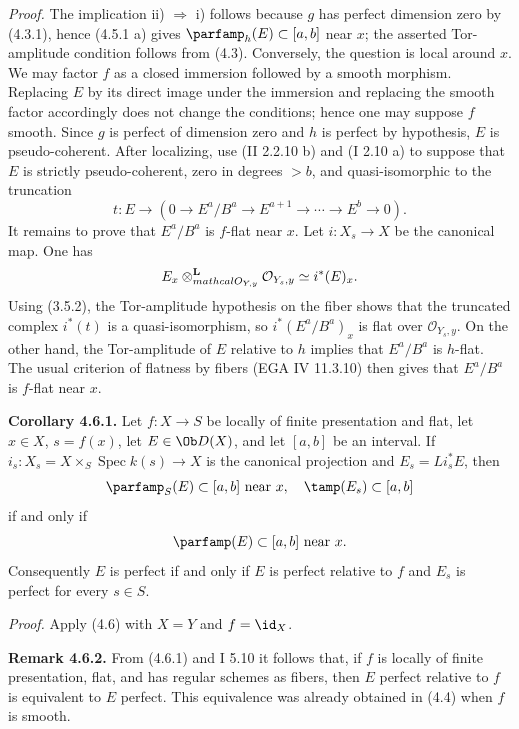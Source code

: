 \documentclass[11pt]{article}
\newcommand{\Spec}{\operatorname{Spec}}
\begin{document}
\emph{Proof.} The implication ii) \(\Rightarrow\) i) follows because \(g\) has perfect dimension zero by (4.3.1), hence (4.5.1 a) gives \(\parfamp_h(E)\subset[a,b]\) near \(x\); the asserted Tor-amplitude condition follows from (4.3). Conversely, the question is local around \(x\). We may factor \(f\) as a closed immersion followed by a smooth morphism. Replacing \(E\) by its direct image under the immersion and replacing the smooth factor accordingly does not change the conditions; hence one may suppose \(f\) smooth. Since \(g\) is perfect of dimension zero and \(h\) is perfect by hypothesis, \(E\) is pseudo-coherent. After localizing, use (II 2.2.10 b) and (I 2.10 a) to suppose that \(E\) is strictly pseudo-coherent, zero in degrees \(>b\), and quasi-isomorphic to the truncation
\[
 t:
 E\longrightarrow
 (0\to E^a/B^a\to E^{a+1}\to\cdots\to E^b\to0).
\]
It remains to prove that \(E^a/B^a\) is \(f\)-flat near \(x\). Let \(i:X_s\to X\) be the canonical map. One has
\[
 E_x\otimes_{\\mathcal O_{Y,y}}^{\mathbf L}\mathcal O_{Y_s,y}
 \simeq i^*(E)_x.
\]
Using (3.5.2), the Tor-amplitude hypothesis on the fiber shows that the truncated complex \(i^*(t)\) is a quasi-isomorphism, so \(i^*(E^a/B^a)_x\) is flat over \(\mathcal O_{Y_s,y}\). On the other hand, the Tor-amplitude of \(E\) relative to \(h\) implies that \(E^a/B^a\) is \(h\)-flat. The usual criterion of flatness by fibers (EGA IV 11.3.10) then gives that \(E^a/B^a\) is \(f\)-flat near \(x\).

\textbf{Corollary 4.6.1.} Let \(f:X\to S\) be locally of finite presentation and flat, let \(x\in X\), \(s=f(x)\), let \(E\in\Ob D(X)\), and let \([a,b]\) be an interval. If \(i_s:X_s=X\times_S\Spec k(s)\to X\) is the canonical projection and \(E_s=Li_s^*E\), then
\[
 \parfamp_S(E)
  \subset[a,b]\text{ near }x,
 \quad
 \tamp(E_s)
  \subset[a,b]
\]
if and only if
\[
 \parfamp(E)
  \subset[a,b]\text{ near }x.
\]
Consequently \(E\) is perfect if and only if \(E\) is perfect relative to \(f\) and \(E_s\) is perfect for every \(s\in S\).

\emph{Proof.} Apply (4.6) with \(X=Y\) and \(f=\id_X\).

\textbf{Remark 4.6.2.} From (4.6.1) and I 5.10 it follows that, if \(f\) is locally of finite presentation, flat, and has regular schemes as fibers, then \(E\) perfect relative to \(f\) is equivalent to \(E\) perfect. This equivalence was already obtained in (4.4) when \(f\) is smooth.
\end{document}
